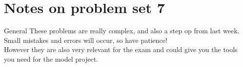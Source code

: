 \documentclass[10pt,danish,t,10pt]{beamer}
\begin{document}
\section{Notes on problem set 7}

\begin{frame}{General}
    These problems are really complex, and also a step op from last week. Small mistakes and errors will occur, so have patience! \\
    However they are also very relevant for the exam and could give you the tools you need for the model project.
\end{frame}
\end{document}
